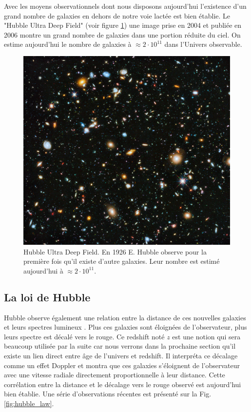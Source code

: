 Avec les moyens observationnels dont nous disposons aujourd'hui l’existence d'un grand nombre de galaxies en dehors de notre voie lactée est bien établie.
Le "Hubble Ultra Deep Field"  (voir figure \ref{fig:hubbl_deep_field}) une image prise en 2004 et publiée en 2006 \citep{1538-3881-132-5-1729} montre un grand nombre de galaxies dans une portion réduite du ciel.
On estime aujourd'hui le nombre de galaxies à $\approx 2 \cdot 10^{11}$ dans l'Univers observable.

\begin{figure}[bth]
        \includegraphics[width=.9\linewidth]{img/01/hudf.jpeg} 
        \caption[Hubble Ultra Deep Field]{Hubble Ultra Deep Field.
		En 1926 E. Hubble observe pour la première fois qu'il existe d'autre galaxies.
		Leur nombre est estimé aujourd'hui à $\approx 2 \cdot 10^{11}$.
 		\label{fig:hubbl_deep_field}}
\end{figure}

\subsection{La loi de Hubble}
Hubble observe également une relation entre la distance de ces nouvelles galaxies et leurs spectres lumineux \citep{1929CoMtW...3...23H}.
Plus ces galaxies sont éloignées de l'observateur, plus leurs spectre est décalé vers le rouge.
Ce redshift noté $z$ est une notion qui sera beaucoup utilisée par la suite car nous verrons dans la prochaine section qu'il existe un lien direct entre âge de l'univers et redshift.
Il interpréta ce décalage comme un effet Doppler et montra que ces galaxies s'éloignent de l'observateur avec une vitesse radiale directement proportionnelle à leur distance.
Cette corrélation entre la distance et le décalage vers le rouge observé est aujourd'hui bien établie.
Une série d'observations récentes est présenté sur la Fig. \ref{fig:hubble_law}.

